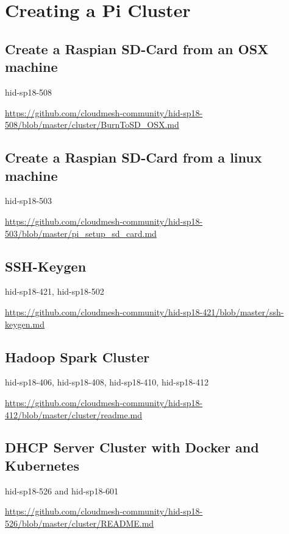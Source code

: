 \chapter{Creating a Pi Cluster}

\section{Create a Raspian SD-Card from an OSX machine}

hid-sp18-508

\url{https://github.com/cloudmesh-community/hid-sp18-508/blob/master/cluster/BurnToSD_OSX.md}


\section{Create a Raspian SD-Card from a linux machine}

hid-sp18-503 

\url{https://github.com/cloudmesh-community/hid-sp18-503/blob/master/pi_setup_sd_card.md}

\section{SSH-Keygen}

hid-sp18-421, hid-sp18-502

\url{https://github.com/cloudmesh-community/hid-sp18-421/blob/master/ssh-keygen.md}


\section{Hadoop Spark Cluster }

hid-sp18-406,  hid-sp18-408, hid-sp18-410, hid-sp18-412

\url{https://github.com/cloudmesh-community/hid-sp18-412/blob/master/cluster/readme.md}

 

\section{DHCP Server Cluster with Docker and Kubernetes }

hid-sp18-526 and hid-sp18-601

\url{https://github.com/cloudmesh-community/hid-sp18-526/blob/master/cluster/README.md}


